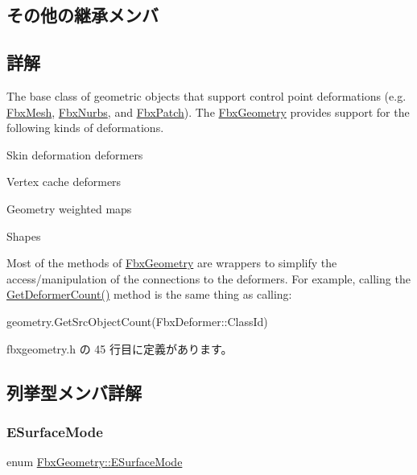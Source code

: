 \subsection*{その他の継承メンバ}


\subsection{詳解}
The base class of geometric objects that support control point deformations (e.\+g. \hyperlink{class_fbx_mesh}{Fbx\+Mesh}, \hyperlink{class_fbx_nurbs}{Fbx\+Nurbs}, and \hyperlink{class_fbx_patch}{Fbx\+Patch}). The \hyperlink{class_fbx_geometry}{Fbx\+Geometry} provides support for the following kinds of deformations.

\begin{DoxyItemize}
\item Skin deformation deformers \item Vertex cache deformers \item Geometry weighted maps \item Shapes\end{DoxyItemize}
Most of the methods of \hyperlink{class_fbx_geometry}{Fbx\+Geometry} are wrappers to simplify the access/manipulation of the connections to the deformers. For example, calling the \hyperlink{class_fbx_geometry_a8cca6f160b52ee1ffd799c599c36f784}{Get\+Deformer\+Count()} method is the same thing as calling\+:


\begin{DoxyCode}
geometry.GetSrcObjectCount(FbxDeformer::ClassId)
\end{DoxyCode}
 

 fbxgeometry.\+h の 45 行目に定義があります。



\subsection{列挙型メンバ詳解}
\mbox{\label{class_fbx_geometry_adb9d2e34481a2cb40f1d783c665794db}} 
\subsubsection{\texorpdfstring{E\+Surface\+Mode}{ESurfaceMode}}
{\footnotesize\ttfamily enum \hyperlink{class_fbx_geometry_adb9d2e34481a2cb40f1d783c665794db}{Fbx\+Geometry\+::\+E\+Surface\+Mode}}

